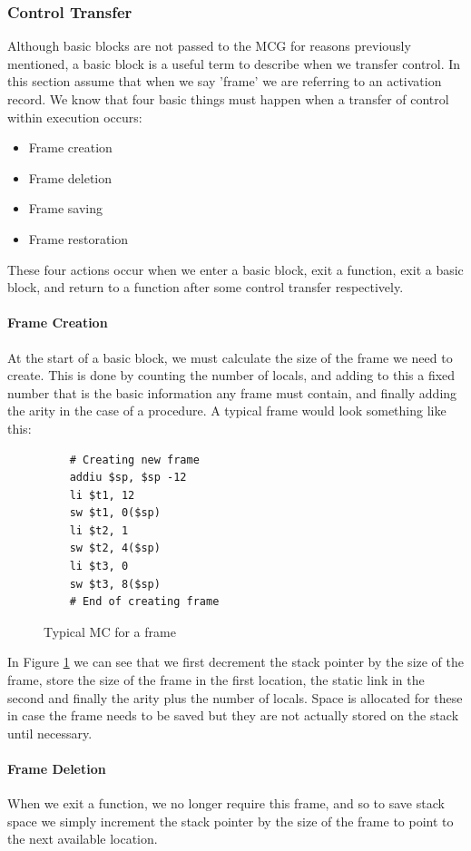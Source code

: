 \documentclass[12pt]{article}
\begin{document}
\subsubsection{Control Transfer}\label{transfer}
Although basic blocks are not passed to the MCG for reasons previously mentioned, a basic block is a useful term to describe when we transfer control. In this section assume that when we say 'frame' we are referring to an activation record. We know that four basic things must happen when a transfer of control within execution occurs:
\begin{itemize}
  \item Frame creation 
  \item Frame deletion
  \item Frame saving
  \item Frame restoration
\end{itemize} 
These four actions occur when we enter a basic block, exit a function, exit a basic block, and return to a function after some control transfer respectively.
\paragraph{Frame Creation} At the start of a basic block, we must calculate the size of the frame we need to create. This is done by counting the number of locals, and adding to this a fixed number that is the basic information any frame must contain, and finally adding the arity in the case of a procedure. A typical frame would look something like this: 
\begin{figure}[H]
  \begin{verbatim}
    # Creating new frame
    addiu $sp, $sp -12
    li $t1, 12
    sw $t1, 0($sp)
    li $t2, 1
    sw $t2, 4($sp)
    li $t3, 0
    sw $t3, 8($sp)
    # End of creating frame
  \end{verbatim}
  \caption{Typical MC for a frame}
  \label{mcgenframe}
\end{figure}
In Figure \ref{mcgenframe} we can see that we first decrement the stack pointer by the size of the frame, store the size of the frame in the first location, the static link in the second and finally the arity plus the number of locals. Space is allocated for these in case the frame needs to be saved but they are not actually stored on the stack until necessary.

\paragraph{Frame Deletion} When we exit a function, we no longer require this frame, and so to save stack space we simply increment the stack pointer by the size of the frame to point to the next available location.
\end{document}
